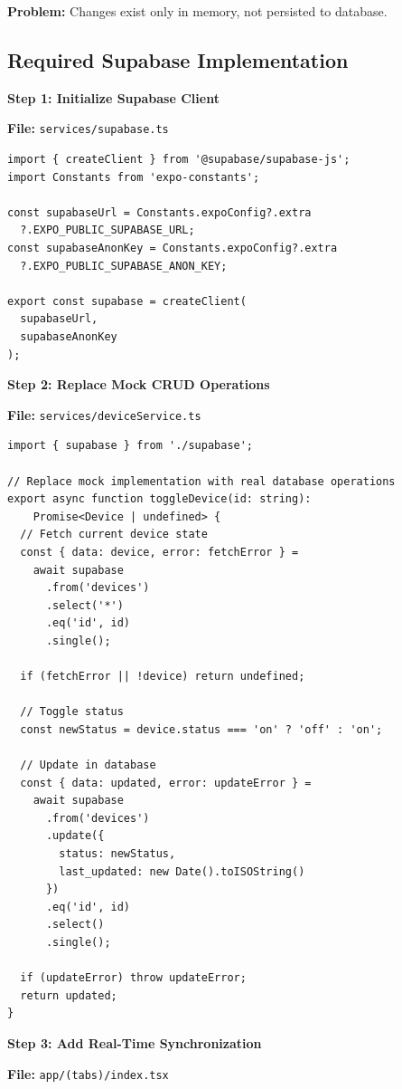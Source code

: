 \documentclass[12pt,a4paper]{article}
\begin{document}
\textbf{Problem:} Changes exist only in memory, not persisted to database.

\subsection{Required Supabase Implementation}

\textbf{Step 1: Initialize Supabase Client}

\textbf{File:} \texttt{services/supabase.ts}

\begin{verbatim}
import { createClient } from '@supabase/supabase-js';
import Constants from 'expo-constants';

const supabaseUrl = Constants.expoConfig?.extra
  ?.EXPO_PUBLIC_SUPABASE_URL;
const supabaseAnonKey = Constants.expoConfig?.extra
  ?.EXPO_PUBLIC_SUPABASE_ANON_KEY;

export const supabase = createClient(
  supabaseUrl, 
  supabaseAnonKey
);
\end{verbatim}

\textbf{Step 2: Replace Mock CRUD Operations}

\textbf{File:} \texttt{services/deviceService.ts}

\begin{verbatim}
import { supabase } from './supabase';

// Replace mock implementation with real database operations
export async function toggleDevice(id: string): 
    Promise<Device | undefined> {
  // Fetch current device state
  const { data: device, error: fetchError } = 
    await supabase
      .from('devices')
      .select('*')
      .eq('id', id)
      .single();

  if (fetchError || !device) return undefined;

  // Toggle status
  const newStatus = device.status === 'on' ? 'off' : 'on';

  // Update in database
  const { data: updated, error: updateError } = 
    await supabase
      .from('devices')
      .update({ 
        status: newStatus, 
        last_updated: new Date().toISOString() 
      })
      .eq('id', id)
      .select()
      .single();

  if (updateError) throw updateError;
  return updated;
}
\end{verbatim}


\textbf{Step 3: Add Real-Time Synchronization}

\textbf{File:} \texttt{app/(tabs)/index.tsx}
\end{document}
